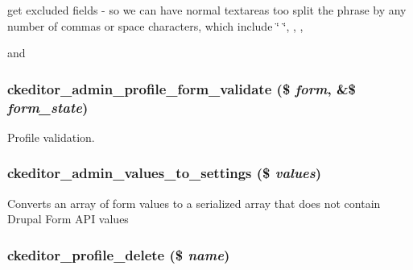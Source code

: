 get excluded fields - so we can have normal textareas too split the phrase by any number of commas or space characters, which include \char`\"{} \char`\"{}, , , \par
 and \hypertarget{ckeditor_8admin_8inc_613b4fca873bca4e3cf3236326371005}{
\subsubsection[{ckeditor\_\-admin\_\-profile\_\-form\_\-validate}]{\setlength{\rightskip}{0pt plus 5cm}ckeditor\_\-admin\_\-profile\_\-form\_\-validate (\$ {\em form}, \/  \&\$ {\em form\_\-state})}}
\label{ckeditor_8admin_8inc_613b4fca873bca4e3cf3236326371005}


Profile validation. \hypertarget{ckeditor_8admin_8inc_263c86e9cdcf83b608ebfa1bb1bc4933}{
\subsubsection[{ckeditor\_\-admin\_\-values\_\-to\_\-settings}]{\setlength{\rightskip}{0pt plus 5cm}ckeditor\_\-admin\_\-values\_\-to\_\-settings (\$ {\em values})}}
\label{ckeditor_8admin_8inc_263c86e9cdcf83b608ebfa1bb1bc4933}


Converts an array of form values to a serialized array that does not contain Drupal Form API values \hypertarget{ckeditor_8admin_8inc_b3470436270ee64522acd37879ae493f}{
\subsubsection[{ckeditor\_\-profile\_\-delete}]{\setlength{\rightskip}{0pt plus 5cm}ckeditor\_\-profile\_\-delete (\$ {\em name})}}
\label{ckeditor_8admin_8inc_b3470436270ee64522acd37879ae493f}


